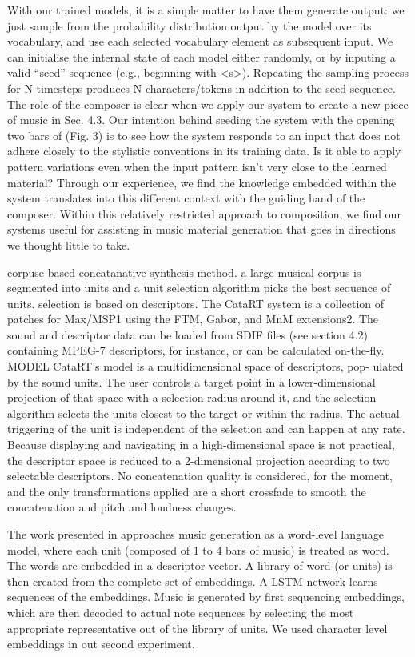 With our trained models, it is a simple matter to have them generate output: we just sample from the probability distribution output by the model over its vocabulary, and use each selected vocabulary element as subsequent input. We can initialise the internal state of each model either randomly, or by inputing a valid “seed” sequence (e.g., beginning with <s>). Repeating the sampling process for N timesteps produces N characters/tokens in addition to the seed sequence.
The role of the composer is clear when we apply our system to create a new
piece of music in Sec. 4.3. Our intention behind seeding the system with the opening two bars of (Fig. 3) is to see how the system responds to an input that does not adhere closely to the stylistic conventions in its training data. Is it able to apply pattern variations even when the input pattern isn’t very close to the learned material? Through our experience, we find the knowledge embedded within the system translates into this different context with the guiding hand of the composer. Within this relatively restricted approach to composition, we find our systems useful for assisting in music material generation that goes in directions we thought little to take.

\cite{Schwarz2006} corpuse based concatanative synthesis method. a large musical corpus is segmented into units and a unit selection algorithm picks the best sequence of units. selection is based on descriptors. The CataRT system is a collection of patches for Max/MSP1 using the FTM, Gabor, and MnM extensions2. The sound and descriptor data can be loaded from SDIF files (see section 4.2) containing MPEG-7 descriptors, for instance, or can be calculated on-the-fly. MODEL CataRT’s model is a multidimensional space of descriptors, pop- ulated by the sound units. The user controls a target point in a lower-dimensional projection of that space with a selection radius around it, and the selection algorithm selects the units closest to the target or within the radius. The actual triggering of the unit is independent of the selection and can happen at any rate. Because displaying and navigating in a high-dimensional space is not practical, the descriptor space is reduced to a 2-dimensional projection according to two selectable descriptors. No concatenation quality is considered, for the moment, and the only transformations applied are a short crossfade to smooth the concatenation and pitch and loudness changes. 

\cite{Bretan2016}
The work presented in \cite{Bretan2016} approaches music generation as a word-level language model, where each unit (composed of 1 to 4 bars of music) is treated as word. The words are embedded in a descriptor vector. A library of word (or units) is then created from the complete set of embeddings. A LSTM network learns sequences of the embeddings. Music is generated by first sequencing embeddings, which are then decoded to actual note sequences by selecting the most appropriate representative out of the library of units. We used character level embeddings in out second experiment.

